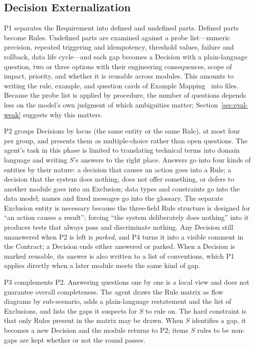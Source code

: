 \documentclass[conference]{IEEEtran}
\begin{document}
\subsection{Decision Externalization}\label{sec:decisions}

P1 separates the Requirement into defined and undefined parts. Defined parts become Rules. Undefined parts are examined against a probe list---numeric precision, repeated triggering and idempotency, threshold values, failure and rollback, data life cycle---and each gap becomes a Decision with a plain-language question, two or three options with their engineering consequences, scope of impact, priority, and whether it is reusable across modules. This amounts to writing the rule, example, and question cards of Example Mapping~\cite{wynne2015example} into files. Because the probe list is applied by procedure, the number of questions depends less on the model's own judgment of which ambiguities matter; Section~\ref{sec:eval-weak} suggests why this matters.

P2 groups Decisions by locus (the same entity or the same Rule), at most four per group, and presents them as multiple-choice rather than open questions. The agent's task in this phase is limited to translating technical terms into domain language and writing $S$'s answers to the right place. Answers go into four kinds of entities by their nature: a decision that causes an action goes into a Rule; a decision that the system does nothing, does not offer something, or defers to another module goes into an Exclusion; data types and constraints go into the data model; names and fixed messages go into the glossary. The separate Exclusion entity is necessary because the three-field Rule structure is designed for ``an action causes a result''; forcing ``the system deliberately does nothing'' into it produces tests that always pass and discriminate nothing. Any Decision still unanswered when P2 is left is \emph{parked}, and P4 turns it into a visible comment in the Contract; a Decision ends either answered or parked. When a Decision is marked reusable, its answer is also written to a list of conventions, which P1 applies directly when a later module meets the same kind of gap.

P3 complements P2. Answering questions one by one is a local view and does not guarantee overall completeness. The agent draws the Rule matrix as flow diagrams by sub-scenario, adds a plain-language restatement and the list of Exclusions, and lists the gaps it suspects for $S$ to rule on. The hard constraint is that only Rules present in the matrix may be drawn. When $S$ identifies a gap, it becomes a new Decision and the module returns to P2; items $S$ rules to be non-gaps are kept whether or not the round passes.
\end{document}
